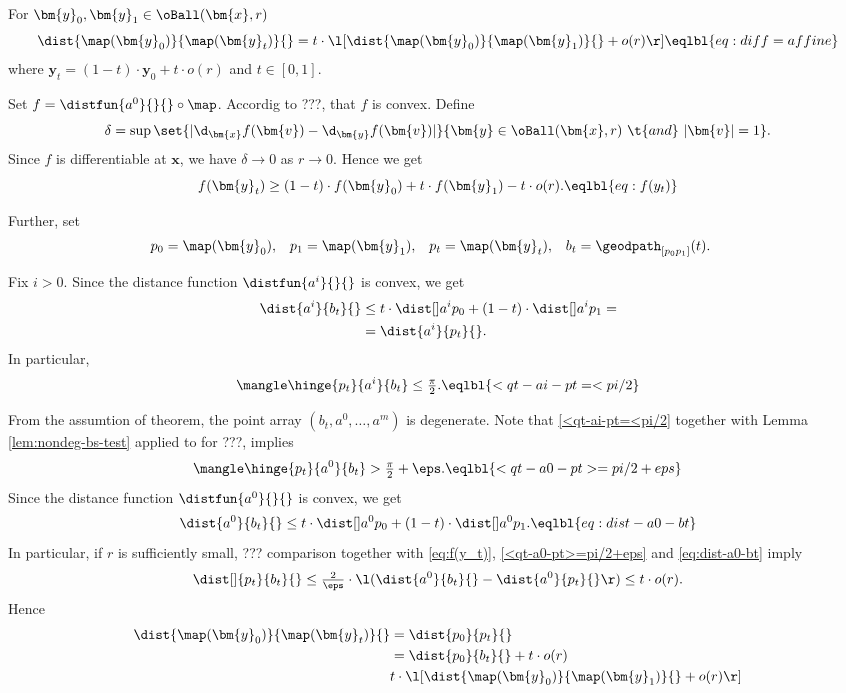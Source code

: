 \begin{clm}{}\label{clm:almost-affine}
For $\bm{y}_0,\bm{y}_1\in\oBall(\bm{x},r)$
\[\dist{\map(\bm{y}_0)}{\map(\bm{y}_t)}{}
=
t
\cdot
\l[
\dist{\map(\bm{y}_0)}{\map(\bm{y}_1)}{}
+
o(r)
\r]
\eqlbl{eq:diff=affine}
\]
where 
$\bm{y}_t=(1-t)\cdot \bm{y}_0+t\cdot o(r)$ and $t\in [0,1]$.
\end{clm}

Set $f=\distfun{a^0}{}{}\circ\map$.
Accordig to ???,
that $f$ is convex.
Define
\[\delta
=
\sup
\set{|\d_{\bm{x}}f(\bm{v})-\d_{\bm{y}}f(\bm{v})|}%
{\bm{y}\in\oBall(\bm{x},r)\ \t{and}\ |\bm{v}|=1}.\]
Since $f$ is differentiable at $\bm{x}$,
we have $\delta\to 0$ as $r\to0$.
Hence we get 
\[f(\bm{y}_t)
\ge 
(1-t)\cdot f(\bm{y}_0)+t\cdot f(\bm{y}_1)-t\cdot o(r).
\eqlbl{eq:f(y_t)}\]

Further, set 
\begin{align*}
 p_0&=\map(\bm{y}_0),
&p_1&=\map(\bm{y}_1),
&p_t&=\map(\bm{y}_t),
&b_t&=\geodpath_{[p_0p_1]}(t).
\end{align*}

Fix $i>0$.
Since the distance function $\distfun{a^i}{}{}$ is convex, 
we get
\begin{align*}
 \dist{a^i}{b_t}{}
&\le 
t\cdot\dist[{{}}]{a^i}{p_0}{}
+
(1-t)\cdot\dist[{{}}]{a^i}{p_1}{}=
\\
&=\dist{a^i}{p_t}{}.
\end{align*}
In particular,
\[ \mangle\hinge{p_t}{a^i}{b_t}\le \tfrac\pi2.
\eqlbl{<qt-ai-pt=<pi/2}\]

From the assumtion of theorem,
the point array $(b_t,a^0,\dots,a^m)$ is degenerate.
Note that \ref{<qt-ai-pt=<pi/2}
together with Lemma \ref{lem:nondeg-bs-test} applied to for ???,
implies
\[\mangle\hinge{p_t}{a^0}{b_t}>\tfrac\pi2+\eps.
\eqlbl{<qt-a0-pt>=pi/2+eps}\]
Since the distance function $\distfun{a^0}{}{}$ is convex, 
we get
\[
\dist{a^0}{b_t}{}
\le 
t\cdot\dist[{{}}]{a^0}{p_0}{}
+
(1-t)\cdot\dist[{{}}]{a^0}{p_1}{}.
\eqlbl{eq:dist-a0-bt}
\]
In particular, if $r$ is sufficiently small, 
??? comparison 
together with \ref{eq:f(y_t)}, \ref{<qt-a0-pt>=pi/2+eps} and \ref{eq:dist-a0-bt} 
imply
\[\dist[]{p_t}{b_t}{}
\le 
\tfrac{2}{\eps}\cdot\l( \dist{a^0}{b_t}{}-\dist{a^0}{p_t}{}\r)\le t\cdot o(r).\]
Hence 
\begin{align*}
\dist{\map(\bm{y}_0)}{\map(\bm{y}_t)}{}
&=\dist{p_0}{p_t}{}
\\
&=\dist{p_0}{b_t}{}+t\cdot o(r)
\\
&
t
\cdot
\l[
\dist{\map(\bm{y}_0)}{\map(\bm{y}_1)}{}
+
o(r)
\r] 
\end{align*}
\claimqedsf

